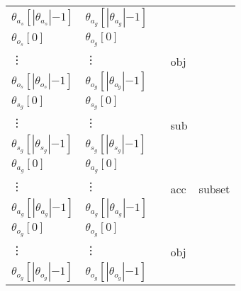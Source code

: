 \documentclass[10pt, twocolumn]{article}
\begin{document}
\begin{tabular}[t]{|l|l|l|l|l|}
            ${\theta}_{a_s}[|{\theta}_{a_s}|{-1}]$ & ${\theta}_{a_g}[|{\theta}_{a_g}|{-1}]$ & & & \\
            \cline{1-4}
            ${\theta}_{o_s}[0]$ &
            ${\theta}_{o_g}[0]$ &
            &
            \multirow{3}{*}{\begin{sideways}obj\end{sideways}} & \\
            \vdots & \vdots & & & \\
            ${\theta}_{o_s}[|{\theta}_{o_s}|{-1}]$ & ${\theta}_{o_g}[|{\theta}_{o_g}|{-1}]$ & & & \\
            \hline
            ${\theta}_{s_g}[0]$ &
            ${\theta}_{s_g}[0]$ &
            &
            \multirow{3}{*}{\begin{sideways}sub\end{sideways}} &
            \multirow{9}{*}{\begin{sideways}subset\end{sideways}} \\
            \vdots & \vdots & & & \\
            ${\theta}_{s_g}[|{\theta}_{s_g}|{-1}]$ & ${\theta}_{s_g}[|{\theta}_{s_g}|{-1}]$ & & & \\
            \cline{1-4}
            ${\theta}_{a_g}[0]$ &
            ${\theta}_{a_g}[0]$ &
            &
            \multirow{3}{*}{\begin{sideways}acc\end{sideways}} & \\
            \vdots & \vdots & & & \\
            ${\theta}_{a_g}[|{\theta}_{a_g}|{-1}]$ & ${\theta}_{a_g}[|{\theta}_{a_g}|{-1}]$ & & & \\
            \cline{1-4}
            ${\theta}_{o_g}[0]$ &
            ${\theta}_{o_g}[0]$ &
            &
            \multirow{3}{*}{\begin{sideways}obj\end{sideways}} & \\
            \vdots & \vdots & & & \\
            ${\theta}_{o_g}[|{\theta}_{o_g}|{-1}]$ & ${\theta}_{o_g}[|{\theta}_{o_g}|{-1}]$ & & & \\
            \hline
          \end{tabular}
\end{document}

